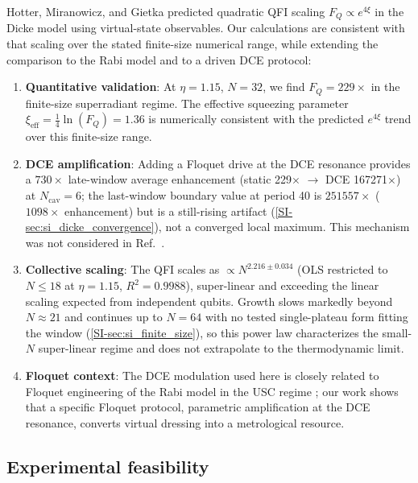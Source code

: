 \documentclass[aps,prxquantum,preprint,superscriptaddress,amsmath,amssymb]{revtex4-2}
\begin{document}
Hotter, Miranowicz, and Gietka \cite{Hotter2025} predicted quadratic QFI scaling $F_Q \propto e^{4\xi}$ in the Dicke model using virtual-state observables. Our calculations are consistent with that scaling over the stated finite-size numerical range, while extending the comparison to the Rabi model and to a driven DCE protocol:

\begin{enumerate}
    \item \textbf{Quantitative validation}: At $\eta=\num{1.15}$, $N=\num{32}$, we find $F_Q = \num{229}\times$ in the finite-size superradiant regime. The effective squeezing parameter $\xi_{\text{eff}} = \frac{1}{4}\ln(F_Q) = \num{1.36}$ is numerically consistent with the predicted $e^{4\xi}$ trend over this finite-size range.

    \item \textbf{DCE amplification}: Adding a Floquet drive at the DCE resonance provides a $\num{730}\times$ late-window average enhancement (static \num{229}$\times$ $\to$ DCE \num{167271}$\times$) at $N_{\text{cav}}=\num{6}$; the last-window boundary value at period \num{40} is $\num{251557}\times$ ($\num{1098}\times$ enhancement) but is a still-rising artifact (\cref{SI-sec:si_dicke_convergence}), not a converged local maximum. This mechanism was not considered in Ref.~\cite{Hotter2025}.

\item \textbf{Collective scaling}: The QFI scales as $\propto N^{\num{2.216}\pm\num{0.034}}$ (OLS restricted to $N\le\num{18}$ at $\eta=\num{1.15}$, $R^2=\num{0.9988}$), super-linear and exceeding the linear scaling expected from independent qubits. Growth slows markedly beyond $N\approx\num{21}$ and continues up to $N=\num{64}$ with no tested single-plateau form fitting the window (\cref{SI-sec:si_finite_size}), so this power law characterizes the small-$N$ super-linear regime and does not extrapolate to the thermodynamic limit.

\item \textbf{Floquet context}: The DCE modulation used here is closely related to Floquet engineering of the Rabi model in the USC regime \cite{Akbari2025}; our work shows that a specific Floquet protocol, parametric amplification at the DCE resonance, converts virtual dressing into a metrological resource.
\end{enumerate}

\subsection{Experimental feasibility}
\end{document}
